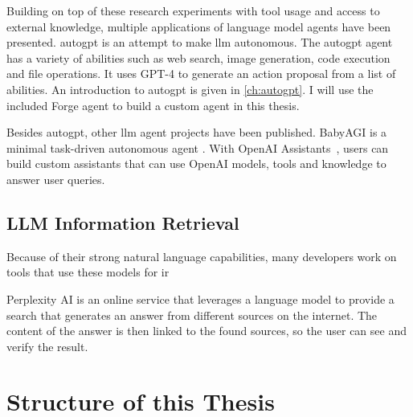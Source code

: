 \documentclass[../main.tex]{subfiles}
\begin{document}
Building on top of these research experiments with tool usage and access to external knowledge,
multiple applications of language model agents have been presented.
\Gls{autogpt} \cite{SignificantGravitas2023} is an attempt to make \gls{llm} autonomous.
The \gls{autogpt} agent has a variety of abilities such as web search,
image generation, code execution and file operations.
It uses GPT-4 to generate an action proposal from a list of abilities.
An introduction to \gls{autogpt} is given in \autoref{ch:autogpt}.
I will use the included Forge agent to build a custom agent in this thesis.

Besides \gls{autogpt}, other \gls{llm} agent projects have been published.
BabyAGI is a minimal task-driven autonomous agent \cite{Nakajima2023}.
With OpenAI Assistants~\cite{zotero-195},
users can build custom assistants
that can use OpenAI models, tools and knowledge to answer user queries.

\subsection{LLM Information Retrieval}

Because of their strong natural language capabilities,
many developers work on tools that use these models for \gls{ir}

Perplexity AI \cite{zotero-197} is an online service that leverages a language model
to provide a search that generates an answer from different sources on the internet.
The content of the answer is then linked to the found sources,
so the user can see and verify the result.

\section{Structure of this Thesis}
\end{document}
